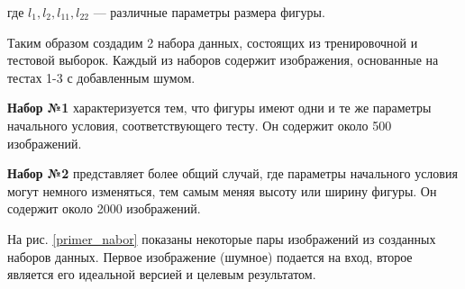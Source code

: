 \documentclass[12pt, a4paper]{article}
\begin{document}
где $l_1, l_2, l_{11}, l_{22}$ --- различные параметры размера фигуры.


Таким образом создадим 2 набора данных, состоящих из тренировочной и тестовой выборок. Каждый из наборов содержит изображения, основанные на тестах 1-3 с добавленным шумом.

\textbf{Набор №1} характеризуется тем, что фигуры имеют одни и те же параметры начального условия, соответствующего тесту. Он содержит около 500 изображений.

\textbf{Набор №2} представляет более общий случай, где параметры начального условия могут немного изменяться, тем самым меняя высоту или ширину фигуры. Он содержит около 2000 изображений.

На рис. \ref{primer_nabor} показаны некоторые пары изображений из созданных наборов данных. Первое изображение (шумное) подается на вход, второе является его идеальной версией и целевым результатом.
\end{document}

